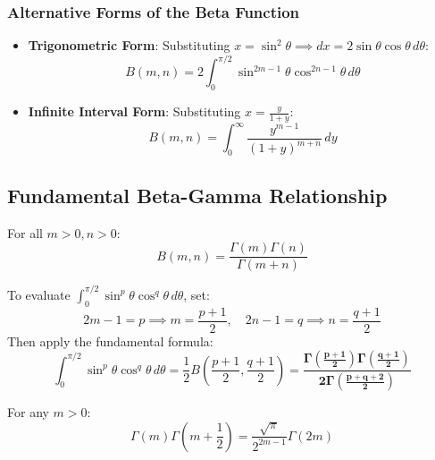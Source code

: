 \subsubsection{Alternative Forms of the Beta Function}
\begin{itemize}[leftmargin=1.5em]
    \item \textbf{Trigonometric Form}: Substituting $x = \sin^2\theta \implies dx = 2\sin\theta\cos\theta\,d\theta$:
    \begin{equation}
        B(m,n) = 2 \int_0^{\pi/2} \sin^{2m-1}\theta \cos^{2n-1}\theta\,d\theta
    \end{equation}
    \item \textbf{Infinite Interval Form}: Substituting $x = \frac{y}{1+y}$:
    \begin{equation}
        B(m,n) = \int_0^\infty \frac{y^{m-1}}{(1+y)^{m+n}}\,dy
    \end{equation}
\end{itemize}

\subsection{Fundamental Beta-Gamma Relationship}

\begin{theorem}
For all $m > 0, n > 0$:
\begin{equation}
    B(m,n) = \frac{\Gamma(m)\Gamma(n)}{\Gamma(m+n)}
\end{equation}
\end{theorem}

\begin{methodbox}
To evaluate $\int_0^{\pi/2} \sin^p\theta \cos^q\theta\,d\theta$, set:
\begin{equation}
    2m - 1 = p \implies m = \frac{p+1}{2}, \quad 2n - 1 = q \implies n = \frac{q+1}{2}
\end{equation}
Then apply the fundamental formula:
\begin{equation}
    \int_0^{\pi/2} \sin^p\theta \cos^q\theta\,d\theta = \frac{1}{2} B\left(\frac{p+1}{2}, \frac{q+1}{2}\right) = \mathbf{\frac{\Gamma\left(\frac{p+1}{2}\right)\Gamma\left(\frac{q+1}{2}\right)}{2\Gamma\left(\frac{p+q+2}{2}\right)}}
\end{equation}
\end{methodbox}

\begin{theorem}
For any $m > 0$:
\begin{equation}
    \Gamma(m)\Gamma\left(m + \frac{1}{2}\right) = \frac{\sqrt{\pi}}{2^{2m-1}} \Gamma(2m)
\end{equation}
\end{theorem}

